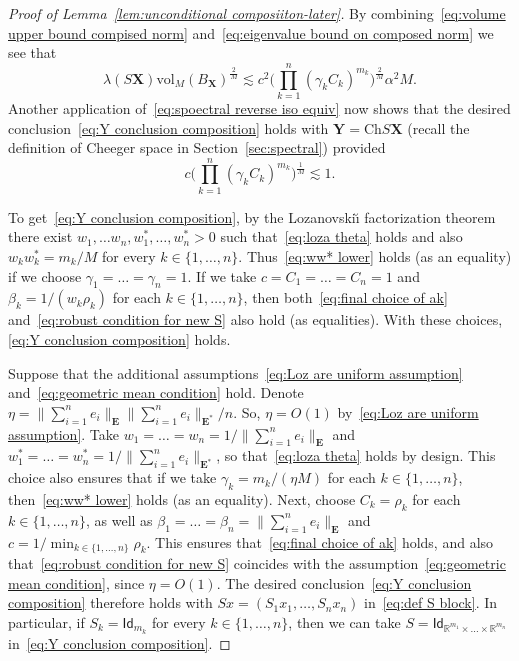 \documentclass[11pt,reqno]{amsart}
\newcommand{\n}{\{1,\ldots,n\}}
\newcommand{\X}{\mathbf X}
\newcommand{\Y}{\mathbf Y}
\newcommand{\R}{\mathbb R}
\theoremstyle{remark}
\newcommand{\Id}{\mathsf{Id}}
\newcommand{\Ch}{\mathrm{Ch}}
\newcommand{\vol}{\mathrm{vol}}
\renewcommand{\1}{\mathbf 1}
\newcommand{\bfE}{\mathbf{E}}
\begin{document}
\begin{proof}[Proof of Lemma~\ref{lem:unconditional composiiton-later}]
By combining~\eqref{eq:volume upper bound compised norm} and~\eqref{eq:eigenvalue bound on composed norm} we see that
$$
\lambda(S\X)\vol_{M}(B_\X)^{\frac{2}{M}}\lesssim c^2\bigg(\prod_{k=1}^n (\gamma_kC_k)^{m_k}\bigg)^{\frac{2}{M}}\alpha^2M.
$$
Another application of~\eqref{eq:spoectral reverse iso equiv} now shows that the desired conclusion~\eqref{eq:Y conclusion composition} holds with $\Y=\Ch S \X$ (recall the definition of Cheeger space in Section~\ref{sec:spectral}) provided
\begin{equation}\label{eq:robust condition for new S}
c\bigg(\prod_{k=1}^n (\gamma_kC_k)^{m_k}\bigg)^{\frac{1}{M}}\lesssim 1.
\end{equation}

To get~\eqref{eq:Y conclusion composition}, by the Lozanovski\u{\i} factorization theorem~\cite{Loz69} there exist $w_1,\ldots w_n,w_1^*,\ldots,w_n^*>0$ such that~\eqref{eq:loza theta} holds and also $w_kw_k^*=m_k/M$ for every $k\in \n$. Thus~\eqref{eq:ww* lower} holds (as an equality) if we choose $\gamma_1=\ldots=\gamma_n=1$. If we take $c=C_1=\ldots=C_n=1$ and $\beta_k=1/(w_k\rho_k)$ for each $k\in \n$, then  both~\eqref{eq:final choice of ak} and~\eqref{eq:robust condition for new S} also hold (as equalities). With these choices, \eqref{eq:Y conclusion composition} holds.

Suppose that the additional assumptions~\eqref{eq:Loz are uniform assumption} and~\eqref{eq:geometric mean condition} hold. Denote $\eta=\|\sum_{i=1}^n e_i\|_{\bfE}\|\sum_{i=1}^n e_i\|_{\bfE^{\textbf{*}}}/n$. So, $\eta=O(1)$ by~\eqref{eq:Loz are uniform assumption}.  Take
 $w_1=\ldots=w_n=1/\|\sum_{i=1}^n e_i\|_{\bfE}$ and $w_1^*=\ldots=w_n^*=1/\|\sum_{i=1}^n e_i\|_{\bfE^{\textbf{*}}}$, so that~\eqref{eq:loza theta} holds by design. This choice also ensures that if we take  $\gamma_k=m_k/(\eta M)$ for each $k\in \n$, then~\eqref{eq:ww* lower} holds (as an equality). Next, choose  $C_k=\rho_k$ for each $k\in \n$, as well as $\beta_1=\ldots=\beta_n=\|\sum_{i=1}^n e_i\|_\bfE$ and  $c=1/\min_{k\in \n} \rho_k$. This ensures that~\eqref{eq:final choice of ak} holds,  and also that~\eqref{eq:robust condition for new S} coincides with the assumption~\eqref{eq:geometric mean condition}, since $\eta=O(1)$. The desired conclusion~\eqref{eq:Y conclusion composition} therefore holds with $Sx=(S_1x_1,\ldots,S_nx_n)$ in~\eqref{eq:def S block}. In particular, if $S_k=\Id_{m_k}$ for every $k\in \n$, then we can take $S=\Id_{\R^{m_1}\times\ldots\times \R^{m_n}}$ in~\eqref{eq:Y conclusion composition}.
\end{proof}
\end{document}
